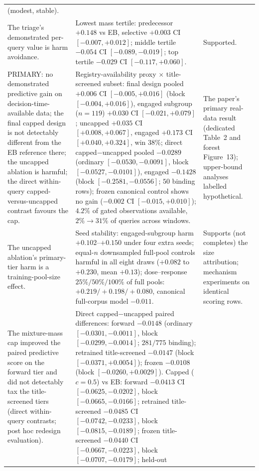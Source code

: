 \documentclass[11pt]{article}
\begin{document}
\begin{longtable}{p{} p{} p{}}
(modest, stable). \\
The triage's demonstrated per-query value is harm avoidance. & Lowest mass
tertile: predecessor $+0.148$ vs EB, selective $+0.003$ CI $[-0.007,+0.012]$;
middle tertile $-0.054$ CI $[-0.089,-0.019]$; top tertile $-0.029$ CI
$[-0.117,+0.060]$. & Supported. \\
PRIMARY: no demonstrated predictive gain on decision-time-available
data; the final
capped design is not detectably different from the EB reference there;
the uncapped ablation is harmful; the direct within-query
capped-versus-uncapped contrast favours the cap. &
Registry-availability proxy $\times$ title-screened subset: final design
pooled $+0.006$ CI $[-0.005,+0.016]$ (block $[-0.004,+0.016]$), engaged
subgroup ($n=119$) $+0.030$ CI $[-0.021,+0.079]$; uncapped $+0.035$ CI
$[+0.008,+0.067]$, engaged $+0.173$ CI $[+0.040,+0.324]$, win $38\%$;
direct capped$-$uncapped pooled $-0.0289$ (ordinary
$[-0.0530,-0.0091]$, block $[-0.0527,-0.0101]$), engaged $-0.1428$
(block $[-0.2581,-0.0556]$; $50$ binding rows);
frozen canonical control shows no gain ($-0.002$ CI $[-0.015,+0.010]$);
$4.2\%$
of gated observations available, $2\%\to31\%$ of queries across windows. &
The paper's primary real-data result (dedicated Table~2 and forest
Figure~13); upper-bound analyses labelled hypothetical. \\
The uncapped ablation's primary-tier harm is a training-pool-size effect. &
Seed stability: engaged-subgroup harm $+0.102$--$+0.150$ under four extra
seeds; equal-$n$ downsampled full-pool controls harmful in all eight draws
($+0.082$ to $+0.230$, mean $+0.13$); dose--response $25\%/50\%/100\%$ of
full pools:
$+0.219/+0.198/+0.080$, canonical full-corpus model $-0.011$. & Supports
(not completes) the size attribution; mechanism experiments on identical
scoring rows. \\
The mixture-mass cap improved the paired predictive score on the forward
tier and did not detectably tax the title-screened tiers (direct
within-query contrasts; post hoc
redesign evaluation). & Direct capped$-$uncapped paired differences:
forward $-0.0148$ (ordinary $[-0.0301,-0.0011]$, block
$[-0.0299,-0.0014]$; $281/775$ binding); retrained title-screened
$-0.0147$ (block $[-0.0371,+0.0054]$); frozen $-0.0108$ (block
$[-0.0260,+0.0029]$). Capped
($c=0.5$) vs EB: forward $-0.0413$ CI $[-0.0625,-0.0202]$, block
$[-0.0665,-0.0166]$; retrained
title-screened $-0.0485$ CI $[-0.0742,-0.0233]$, block
$[-0.0815,-0.0189]$; frozen title-screened
$-0.0440$ CI $[-0.0667,-0.0223]$, block $[-0.0707,-0.0179]$; held-out

\end{longtable}
\end{document}
